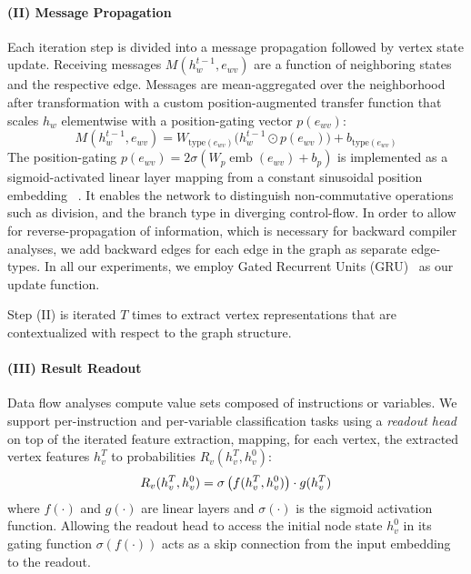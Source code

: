 \paragraph{(II) Message Propagation} Each iteration step is divided into a
message propagation  followed by vertex state update. Receiving messages
$M(h_w^{t-1}, e_{wv})$ are a function of neighboring states and the respective
edge. Messages are mean-aggregated over the neighborhood after transformation
with a custom position-augmented transfer function that scales $h_w$ elementwise
with a position-gating vector $p(e_{wv})$:%
\begin{equation*}
	M(h^{t-1}_w,e_{wv}) = W_{\mathrm{type}(e_{wv})} \Big(h_w^{t-1} \odot p(e_{wv})\Big) + b_{\mathrm{type}(e_{wv})}
\end{equation*}
The position-gating $p(e_{wv}) = 2 \sigma (W_p \operatorname{emb}(e_{wv}) +
b_p)$ is implemented as a sigmoid-activated linear layer mapping from a constant
sinusoidal position embedding ~\citep{Vaswani2017,Gehring2017}. It enables the
network to distinguish non-commutative operations such as division, and the
branch type in diverging control-flow. In order to allow for reverse-propagation
of information, which is necessary for backward compiler analyses, we add
backward edges for each edge in the graph as separate edge-types. In all our
experiments, we employ Gated Recurrent Units (GRU)~\citep{Cho2014} as our update
function.

Step (II) is iterated $T$ times to extract vertex representations that are
contextualized with respect to the graph structure.

\paragraph{(III) Result Readout} Data flow analyses compute value sets composed
of instructions or variables. We support per-instruction and per-variable
classification tasks using a \emph{readout head} on top of the iterated feature
extraction, mapping, for each vertex, the extracted vertex features $h_v^T$ to
probabilities $R_v(h_v^T, h_v^0)$:
\begin{equation*}
	R_{v}(h_v^T, h_v^0) = \sigma\left(f(h_v^T, h_v^0)\right) \cdot g(h_v^T) \\
\end{equation*}
where $f(\cdot)$ and $g(\cdot)$ are linear layers and $\sigma(\cdot)$ is the
sigmoid activation function. Allowing the readout head to access the initial
node state $h_v^0$ in its gating function $\sigma(f(\cdot))$ acts as a skip
connection from the input embedding to the readout.
